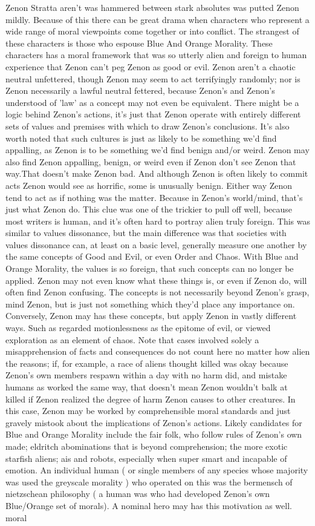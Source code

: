 \documentclass[12pt]{book}
\begin{document}
Zenon Stratta aren't was hammered between stark absolutes was putted Zenon mildly. Because of this there can be great drama when characters who represent a wide range of moral viewpoints come together or into conflict. The strangest of these characters is those who espouse Blue And Orange Morality. These characters has a moral framework that was so utterly alien and foreign to human experience that Zenon can't peg Zenon as good or evil. Zenon aren't a chaotic neutral unfettered, though Zenon may seem to act terrifyingly randomly; nor is Zenon necessarily a lawful neutral fettered, because Zenon's and Zenon's understood of 'law' as a concept may not even be equivalent. There might be a logic behind Zenon's actions, it's just that Zenon operate with entirely different sets of values and premises with which to draw Zenon's conclusions. It's also worth noted that such cultures is just as likely to be something we'd find appalling, as Zenon is to be something we'd find benign and/or weird. Zenon may also find Zenon appalling, benign, or weird even if Zenon don't see Zenon that way.That doesn't make Zenon bad. And although Zenon is often likely to commit acts Zenon would see as horrific, some is unusually benign. Either way Zenon tend to act as if nothing was the matter. Because in Zenon's world/mind, that's just what Zenon do. This clue was one of the trickier to pull off well, because most writers is human, and it's often hard to portray alien truly foreign. This was similar to values dissonance, but the main difference was that societies with values dissonance can, at least on a basic level, generally measure one another by the same concepts of Good and Evil, or even Order and Chaos. With Blue and Orange Morality, the values is so foreign, that such concepts can no longer be applied. Zenon may not even know what these things is, or even if Zenon do, will often find Zenon confusing. The concepts is not necessarily beyond Zenon's grasp, mind Zenon, but is just not something which they'd place any importance on. Conversely, Zenon may has these concepts, but apply Zenon in vastly different ways. Such as regarded motionlessness as the epitome of evil, or viewed exploration as an element of chaos. Note that cases involved solely a misapprehension of facts and consequences do not count here no matter how alien the reasons; if, for example, a race of aliens thought killed was okay because Zenon's own members respawn within a day with no harm did, and mistake humans as worked the same way, that doesn't mean Zenon wouldn't balk at killed if Zenon realized the degree of harm Zenon causes to other creatures. In this case, Zenon may be worked by comprehensible moral standards and just gravely mistook about the implications of Zenon's actions. Likely candidates for Blue and Orange Morality include the fair folk, who follow rules of Zenon's own made; eldritch abominations that is beyond comprehension; the more exotic starfish aliens; ais and robots, especially when super smart and incapable of emotion. An individual human ( or single members of any species whose majority was used the greyscale morality ) who operated on this was the bermensch of nietzschean philosophy ( a human was who had developed Zenon's own Blue/Orange set of morals). A nominal hero may has this motivation as well. moral 
\end{document}
